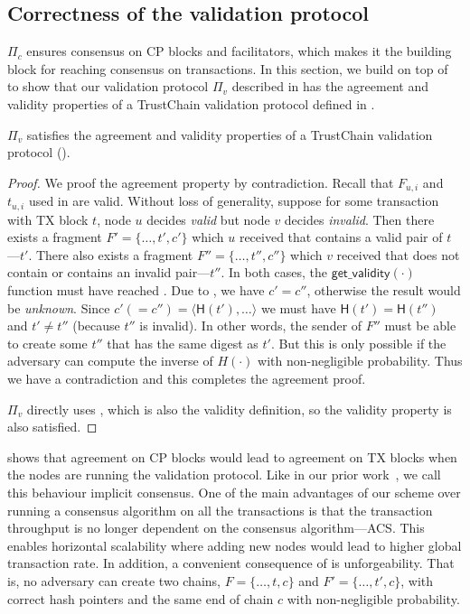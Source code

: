 \subsection{Correctness of the validation protocol}
$\Pi_c$ ensures consensus on CP blocks and facilitators,
which makes it the building block for reaching consensus on transactions.
In this section, we build on top of  to show that our validation protocol $\Pi_v$ described in  has the agreement and validity properties of a TrustChain validation protocol defined in .

\begin{theorem}
\label{theorem:validation-agreement}
$\Pi_v$ satisfies the agreement and validity properties of a TrustChain validation protocol ().
\end{theorem}
\begin{proof}
We proof the agreement property by contradiction.
Recall that $F_{u, i}$ and $t_{u, i}$ used in  are valid.
Without loss of generality, suppose for some transaction with TX block $t$,
node $u$ decides \emph{valid} but node $v$ decides \emph{invalid}.
Then there exists a fragment $F' = \{ \dots, t', c'\}$ which $u$ received that contains a valid pair of $t$---$t'$.
There also exists a fragment $F'' = \{ \dots, t'', c''\}$ which $v$ received that does not contain or contains an invalid pair---$t''$.
In both cases, the $\textsf{get\_validity}(\cdot)$ function must have reached .
Due to , we have $c' = c''$, otherwise the result would be \emph{unknown}.
Since $c' (= c'') = \langle \textsf{H}(t'), \dots \rangle$ we must have $\textsf{H}(t') = \textsf{H}(t'')$ and $t' \ne t''$ (because $t''$ is invalid).
In other words, the sender of $F''$ must be able to create some $t''$ that has the same digest as $t'$.
But this is only possible if the adversary can compute the inverse of $H(\cdot)$ with non-negligible probability.
Thus we have a contradiction and this completes the agreement proof.

$\Pi_v$ directly uses , which is also the validity definition,
so the validity property is also satisfied.
\end{proof}

 shows that agreement on CP blocks would lead to agreement on TX blocks when the nodes are running the validation protocol.
Like in our prior work~\cite{implicitconsensus}, we call this behaviour implicit consensus.
One of the main advantages of our scheme over running a consensus algorithm on all the transactions is that 
the transaction throughput is no longer dependent on the consensus algorithm---ACS.
This enables horizontal scalability where adding new nodes would lead to higher global transaction rate.
In addition, a convenient consequence of  is unforgeability.
That is, no adversary can create two chains,
$F = \{ \dots, t, c\}$ and $F' = \{ \dots, t', c\}$,
with correct hash pointers and the same end of chain $c$ with non-negligible probability.


